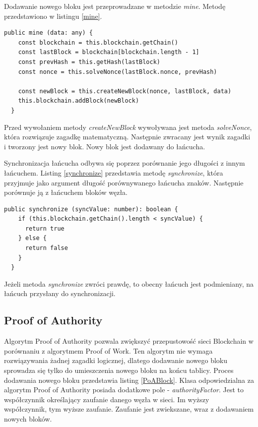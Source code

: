\documentclass[a4paper,12pt]{book}
\begin{document}
Dodawanie nowego bloku jest przeprowadzane w metodzie \textit{mine}. Metodę przedstawiono w listingu \ref{mine}.

\begin{lstlisting}[style=ES6, caption={Dodawanie nowego bloku. Metoda \textit{mine}.},label={mine}]
  public mine (data: any) {
    const blockchain = this.blockchain.getChain()
    const lastBlock = blockchain[blockchain.length - 1]
    const prevHash = this.getHash(lastBlock)
    const nonce = this.solveNonce(lastBlock.nonce, prevHash)

    const newBlock = this.createNewBlock(nonce, lastBlock, data)
    this.blockchain.addBlock(newBlock)
  }
\end{lstlisting}

Przed wywołaniem metody \textit{createNewBlock} wywoływana jest metoda \textit{solveNonce}, która rozwiązuje zagadkę matematyczną. Następnie zwracany jest wynik zagadki i tworzony jest nowy blok. Nowy blok jest dodawany do łańcucha.

Synchronizacja łańcucha odbywa się poprzez porównanie jego długości z innym łańcuchem. Listing \ref{synchronize} przedstawia metodę \textit{synchronize}, która przyjmuje jako argument długość porównywanego łańcucha znaków. Następnie porównuje ją z łańcuchem bloków węzła.

\begin{lstlisting}[style=ES6, caption={Metoda \textit{synchronize}.},label={synchronize}]
  public synchronize (syncValue: number): boolean {
    if (this.blockchain.getChain().length < syncValue) {
      return true
    } else {
      return false
    }
  }
\end{lstlisting}

Jeżeli metoda \textit{synchronize} zwróci prawdę, to obecny łańcuch jest podmieniany, na łańcuch przysłany do synchronizacji.

\subsection{Proof of Authority}

Algorytm Proof of Authority pozwala zwiększyć przepustowość sieci Blockchain w porównaniu z algorytmem Proof of Work. Ten algorytm nie wymaga rozwiązywania żadnej zagadki logicznej, dlatego dodawanie nowego bloku sprowadza się tylko do umieszczenia nowego bloku na końcu tablicy. Proces dodawania nowego bloku przedstawia listing \ref{PoABlock}. Klasa odpowiedzialna za algorytm Proof of Authority posiada dodatkowe pole - \textit{authorityFactor}. Jest to współczynnik określający zaufanie danego węzła w sieci. Im wyższy współczynnik, tym wyższe zaufanie. Zaufanie jest zwiekszane, wraz z dodawaniem nowych bloków.
\end{document}
